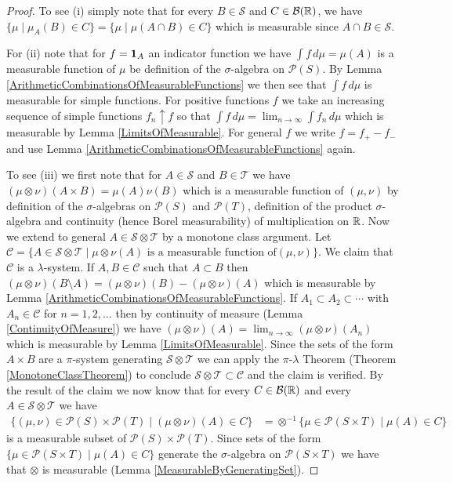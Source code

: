 \begin{proof}
To see (i) simply note that for every $B \in \mathcal{S}$ and $C \in
\mathcal{B}(\mathbb{R})$, we have $\lbrace \mu \mid \mu_A(B) \in C \rbrace
= \lbrace \mu \mid \mu(A \cap B) \in C \rbrace$ which is
measurable since $A \cap B \in \mathcal{S}$.

For (ii) note that for $f=\textbf{1}_{A}$ an indicator function we have $\int f \,
d\mu = \mu(A)$ is a measurable function of $\mu$ be definition of the
$\sigma$-algebra on $\mathcal{P}(S)$.  By Lemma
\ref{ArithmeticCombinationsOfMeasurableFunctions} we then see that
$\int f \, d\mu$ is measurable for simple functions.  For positive
functions $f$ we take an increasing sequence of simple functions $f_n
\uparrow f$ so that $\int f \, d\mu = \lim_{n \to \infty} \int f_n \,
d\mu$ which is measurable by Lemma \ref{LimitsOfMeasurable}.  For
general $f$ we write $f = f_+ - f_-$ and use Lemma
\ref{ArithmeticCombinationsOfMeasurableFunctions} again.

To see (iii) we first note that for $A \in \mathcal{S}$ and $B \in
\mathcal{T}$ we have $(\mu \otimes \nu)(A \times B) = \mu(A)\nu(B)$
which is a measurable function of $(\mu, \nu)$ by definition of the $\sigma$-algebras on
$\mathcal{P}(S)$
and $\mathcal{P}(T)$, definition of the product $\sigma$-algebra and
continuity (hence Borel measurability) of multiplication on $\mathbb{R}$.  Now we extend
to general $A \in \mathcal{S} \otimes \mathcal{T}$ by a monotone class
argument.  Let $\mathcal{C} = \lbrace A \in \mathcal{S} \otimes
\mathcal{T} \mid \mu \otimes \nu(A) \text{ is a measurable function of
} (\mu, \nu) \rbrace$.  We claim that $\mathcal{C}$ is a
$\lambda$-system.  If $A,B \in \mathcal{C}$ such that $A \subset B$
then $(\mu \otimes \nu)(B \setminus A) = (\mu \otimes \nu)(B) - (\mu
\otimes \nu)(A)$ which is measurable by Lemma
\ref{ArithmeticCombinationsOfMeasurableFunctions}.  If $A_1 \subset
A_2 \subset \cdots$ with $A_n \in \mathcal{C}$ for $n = 1, 2, \dotsc$ then by continuity of
measure (Lemma \ref{ContinuityOfMeasure}) we have $(\mu \otimes
\nu)(A) = \lim_{n \to \infty} (\mu \otimes \nu)(A_n)$ which is
measurable by Lemma \ref{LimitsOfMeasurable}.  Since the sets of the
form $A \times B$ are a $\pi$-system generating $\mathcal{S} \otimes
\mathcal{T}$ we can apply the $\pi$-$\lambda$ Theorem (Theorem
\ref{MonotoneClassTheorem}) to conclude $\mathcal{S} \otimes
\mathcal{T} \subset \mathcal{C}$ and the claim is verified.  By the
result of the claim we now know that for every $C \in
\mathcal{B}(\mathbb{R})$ and every $A \in \mathcal{S} \otimes \mathcal{T}$
we have 
\begin{align*}
\lbrace (\mu, \nu) \in \mathcal{P}(S) \times \mathcal{P}(T)
\mid (\mu \otimes \nu) (A) \in C \rbrace &=
\otimes^{-1} \lbrace \mu \in \mathcal{P}(S \times T) \mid \mu (A) \in C \rbrace
\end{align*}
 is a measurable subset of
$\mathcal{P}(S) \times \mathcal{P}(T)$.  Since sets of the form
$\lbrace \mu \in \mathcal{P}(S \times T) \mid \mu (A) \in C \rbrace$
generate the $\sigma$-algebra on $\mathcal{P}(S \times T)$ we have
that $\otimes$ is measurable (Lemma \ref{MeasurableByGeneratingSet}).


\end{proof}
